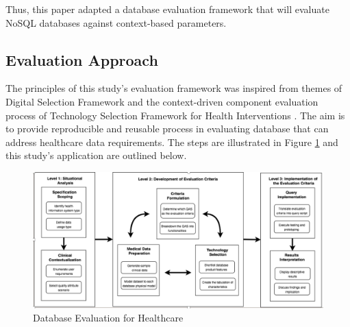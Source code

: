 \documentclass[5p]{elsarticle}
\begin{document}
Thus, this paper adapted a database evaluation framework that will evaluate NoSQL databases against context-based parameters. 

\subsection{Evaluation Approach}
The principles of this study's evaluation framework was inspired from themes of Digital Selection Framework \cite{A.Ostrovsky20141} 
and the context-driven component evaluation process of Technology Selection Framework for Health Interventions \cite{C.Chan2010300}. 
The aim is to provide reproducible and reusable process in evaluating database that can address healthcare data requirements.
The steps are illustrated in Figure \ref{fig.framework} and this study's application are outlined below. 

\begin{figure}[ht]
    \centering
    \includegraphics[scale=0.27] {figure}
    \caption{Database Evaluation for Healthcare}\label{fig.framework}
\end{figure}
\end{document}

